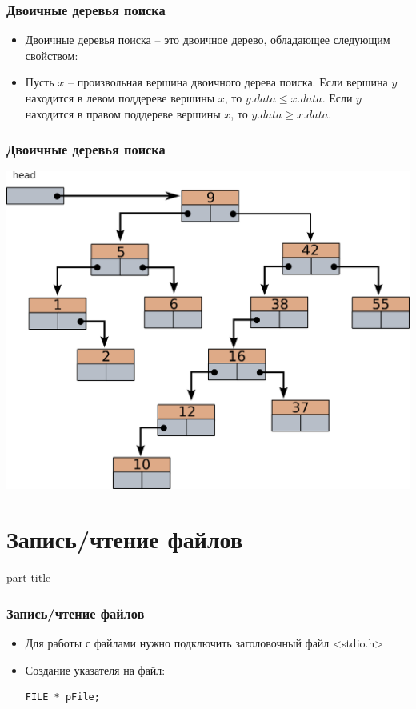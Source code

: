 \documentclass[14pt,pdf,hyperref={unicode}]{beamer}
\begin{document}
\begin{frame}[fragile]
\frametitle{Двоичные деревья поиска} 
\begin{itemize}
\item Двоичные деревья поиска -- это двоичное дерево, обладающее следующим свойством:
\item Пусть $x$ -- произвольная вершина двоичного дерева поиска. Если вершина $y$ находится в левом поддереве
вершины $x$, то $y.data \leq x.data$. Если $y$ находится в правом поддереве вершины $x$, то $y.data \geq x.data$. 
\end{itemize}
\end{frame}

\begin{frame}[fragile]
\frametitle{Двоичные деревья поиска}  
\begin{center}
\includegraphics[width=0.75\linewidth]{images/bintree_search_1.png}
\end{center}
\end{frame}


\section{Запись/чтение файлов}
\begin{frame}
\begin{center}
\begin{beamercolorbox}[sep=8pt,center]{part
title}
\insertsection
\end{beamercolorbox}
\end{center}
\end{frame}

\begin{frame}[fragile]
\frametitle{Запись/чтение файлов} 
\begin{itemize}
\item Для работы с файлами нужно подключить заголовочный файл <stdio.h>
\item Создание указателя на файл:
\begin{lstlisting}
FILE * pFile;
\end{lstlisting}
\end{itemize}
\end{frame}
\end{document}
